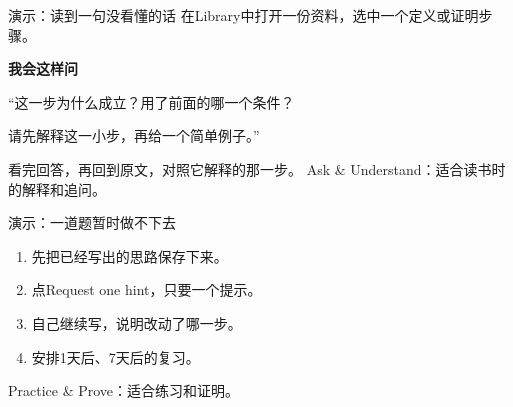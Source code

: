 \documentclass[aspectratio=169,10pt]{beamer}
\newcommand{\key}[1]{{\color{campusgreen}\bfseries #1}}
\begin{document}
\begin{frame}[t]{演示：读到一句没看懂的话}
  在Library中打开一份资料，选中一个定义或证明步骤。
  \par\vspace{8mm}
  \key{我会这样问}
  \par\vspace{3mm}
  “这一步为什么成立？用了前面的哪一个条件？\par
  请先解释这一小步，再给一个简单例子。”
  \par\vspace{7mm}
  看完回答，再回到原文，对照它解释的那一步。
  \vfill
  Ask \& Understand：适合读书时的解释和追问。
\end{frame}

\begin{frame}[t]{演示：一道题暂时做不下去}
  \begin{enumerate}\setlength{\itemsep}{5mm}
    \item 先把已经写出的思路保存下来。
    \item 点Request one hint，只要一个提示。
    \item 自己继续写，说明改动了哪一步。
    \item 安排1天后、7天后的复习。
  \end{enumerate}
  \vfill
  Practice \& Prove：适合练习和证明。
  \par\vspace{3mm}
  \hyperlink{setproblem}{}\hfill
  \hyperlink{summary}{}
\end{frame}
\end{document}
